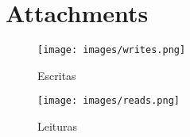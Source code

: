 \newpage
\section{Attachments}

\begin{figure}
    \centering
    \texttt{[image: images/writes.png]}
    \caption{Escritas}
    \label{fig:w_lixo}
\end{figure}

\begin{figure}
    \centering
    \texttt{[image: images/reads.png]}
    \caption{Leituras}
    \label{fig:r_lixo}
\end{figure}